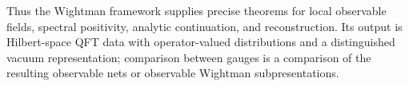 Thus the Wightman framework supplies precise theorems for local observable
fields, spectral positivity, analytic continuation, and reconstruction.  Its
output is Hilbert-space QFT data with operator-valued distributions and a
distinguished vacuum representation; comparison between gauges is a comparison
of the resulting observable nets or observable Wightman subpresentations.
